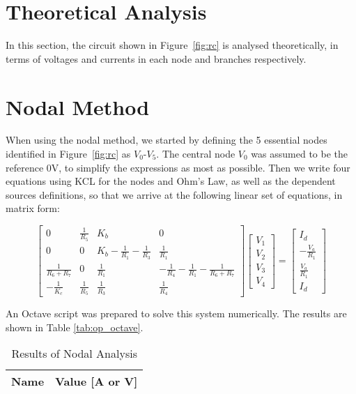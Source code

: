 \section{Theoretical Analysis}
\label{sec:analysis}

In this section, the circuit shown in Figure~\ref{fig:rc} is analysed
theoretically, in terms of voltages and currents in each node and branches respectively.


\section{Nodal Method}

When using the nodal method, we started by defining the 5 essential nodes identified in Figure~\ref{fig:rc} as $V_0$-$V_5$. The central node $V_0$ was assumed to be the reference 0V, to simplify the expressions as most as possible.
Then we write four equations using KCL for the nodes and Ohm's Law, as well as the dependent sources definitions, so that we arrive at the following linear set of equations, in matrix form:


\[
\begin{bmatrix}
0 & \frac{1}{R_5} & K_b & 0 \\
0 & 0 & K_b - \frac{1}{R_1} - \frac{1}{R_3} & \frac{1}{R_1} \\
\frac{1}{R_6 + R_7}  & 0  & \frac{1}{R_1}  & -\frac{1}{R_4}-\frac{1}{R_1}-\frac{1}{R_6+R_7}  \\
-\frac{1}{K_c} & \frac{1}{R_5} & \frac{1}{R_3} & \frac{1}{R_4}  
\end{bmatrix}
\begin{bmatrix}
V_1 \\ V_2 \\ V_3 \\ V_4 
\end{bmatrix}
=
\begin{bmatrix}
I_d \\ -\frac{V_a}{R_1} \\ \frac{V_a}{R_1} \\ I_d
\end{bmatrix}
\]

An Octave script was prepared to solve this system numerically. The results are shown in Table \ref{tab:op_octave}.

\begin{table}[h]
  \centering
  \begin{tabular}{|l|r|}
    \hline
    {\bf Name} & {\bf Value [A or V]} \\ \hline
    
  \end{tabular}
  \caption{Results of Nodal Analysis}
  \label{tab:op_nodal_tab}
\end{table}

